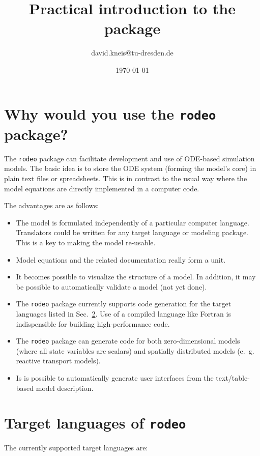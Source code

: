 \documentclass[a4paper]{article}
\title{Practical introduction to the \rodeo{} package}
\author{david.kneis@tu-dresden.de}
\date{\today}
\newcommand{\rodeo}{\texttt{rodeo}}
\begin{document}
\maketitle
\tableofcontents


\section{Why would you use the \rodeo{} package?} \label{sec:why}

The \rodeo{} package can facilitate development and use of ODE-based simulation models. The basic idea is to store the ODE system (forming the model's core) in plain text files or spreadsheets. This is in contrast to the usual way where the model equations are directly implemented in a computer code.

The advantages are as follows:
\begin{itemize}
 \item The model is formulated independently of a particular computer language. Translators could be written for any target language or modeling package. This is a key to making the model re-usable.
 \item Model equations and the related documentation really form a unit.
 \item It becomes possible to visualize the structure of a model. In addition, it may be possible to automatically validate a model (not yet done).
 \item The \rodeo{} package currently supports code generation for the target languages listed in Sec.~\ref{sec:targetLanguages}. Use of a compiled language like Fortran is indispensible for building high-performance code.
 \item The \rodeo{} package can generate code for both zero-dimensional models (where all state variables are scalars) and spatially distributed models (e.~g. reactive transport models).
 \item Is is possible to automatically generate user interfaces from the text/table-based model description.
\end{itemize}


\section{Target languages of \rodeo} \label{sec:targetLanguages}
The currently supported target languages are:
\end{document}
